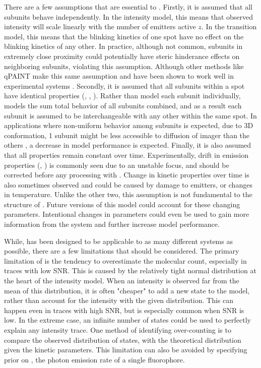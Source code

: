There are a few assumptions that are essential to \ours.
    Firstly, it is assumed that all subunits behave independently.
    In the intensity model, this means that observed intensity will scale linearly with the number of emitters active $z$.
    In the transition model, this means that the blinking kinetics of one spot have no effect on the blinking kinetics of any other.
    In practice, although not common, subunits in extremely close proximity could potentially 
    have steric hinderance effects on neighboring subunits, violating this assumption.
    Although other methods like qPAINT make this same assumption and have been shown to work well in experimental systems \cite{}. 
    Secondly, it is assumed that all subunits within a spot have identical properties (\pon, \poff, \re).
    Rather than model each subunit individually, \ours models the sum total behavior of all subunits combined, 
    and as a result each subunit is assumed to be interchangeable with any other within the same spot.
    In applications where non-uniform behavior among subunits is expected, \eg due to 3D conformation, 
    1 subunit might be less accessible to diffusion of imager than the others \cite{civitci_2020}, a decrease in model performance is expected.
    Finally, it is also assumed that all properties remain constant over time. 
    Experimentally, drift in emission properties (\re, \rb) is commonly seen due to an unstable focus, and should be corrected before any processing with \ours.
    Change in kinetic properties over time is also sometimes observed and could be caused by damage to emitters, or changes in temperature. 
    Unlike the other two, this assumption is not fundamental to the structure of \ours. 
    Future versions of this model could account for these changing parameters.
    Intentional changes in parameters could even be used to gain more information from the system and further increase model performance. 
    

While, \ours has been designed to be applicable to as many different systems as possible, there are a few limitations that should be considered.
    The primary limitation of \ours is the tendency to overestimate the molecular count, especially in traces with low SNR. 
    This is caused by the relatively tight normal distribution at the heart of the intensity model. 
    When an intensity is observed far from the mean of this distribution, it is often "cheaper" to add a new state to the model, 
    rather than account for the intensity with the given distribution. 
    This can happen even in traces with high SNR, but is especially common when SNR is low. 
    In the extreme case, an infinite number of states could be used to perfectly explain any intensity trace.
    One method of identifying over-counting is to compare the observed distribution of states, with the theoretical distribution given the kinetic parameters. %
    This limitation can also be avoided by specifying prior on \re, the photon emission rate of a single fluorophore. 


